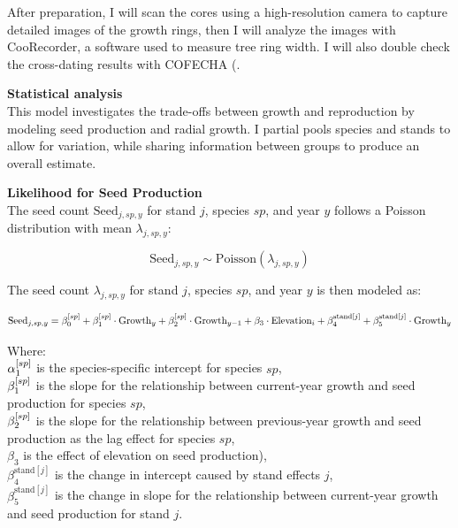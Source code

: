 \documentclass[11pt,letter]{article}
\begin{document}
After preparation, I will scan the cores using a high-resolution camera to capture detailed images of the growth rings, then I will analyze the images with CooRecorder, a software used to measure tree ring width. I will also double check the cross-dating results with COFECHA (\cite{cook2013methods, speer2010fundamentals}.\par

\textbf{Statistical analysis}\\
This model investigates the trade-offs between growth and reproduction by modeling seed production and radial growth. I partial pools species and stands to allow for variation, while sharing information between groups to produce an overall estimate.\par

\textbf{Likelihood for Seed Production}\\

The seed count \(\text{Seed}_{j,sp,y}\) for stand \(j\), species \(sp\), and year \(y\) follows a Poisson distribution with mean \(\lambda_{j,sp,y}\):

\[
\text{Seed}_{j,sp,y} \sim \text{Poisson}(\lambda_{j,sp,y})
\]

The seed count \(\lambda_{j,sp,y}\) for stand \(j\), species \(sp\), and year \(y\) is then modeled as:

\[
\text{Seed}_{j,sp,y} = \beta_0^{\text[sp]} + \beta_1^{\text[sp]} \cdot \text{Growth}_y + \beta_2^{\text[sp]} \cdot \text{Growth}_{y-1} + \beta_3 \cdot \text{Elevation}_i + \beta_4^{\text{stand}[j]} + \beta_5^{\text{stand}[j]} \cdot \text{Growth}_y
\]

Where:\\
\(\alpha_1^{\text[sp]}\) is the species-specific intercept for species \(sp\),\\
\(\beta_1^{\text[sp]}\) is the slope for the relationship between current-year growth and seed production for species \(sp\),\\
\(\beta_2^{\text[sp]}\) is the slope for the relationship between previous-year growth and seed production as the lag effect for species \(sp\),\\
\(\beta_3\) is the effect of elevation on seed production),\\
\(\beta_4^{\text{stand}[j]}\) is the change in intercept caused by stand effects \(j\),\\
\(\beta_5^{\text{stand}[j]}\) is the change in slope for the relationship between current-year growth and seed production for stand \(j\).
\end{document}
